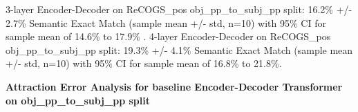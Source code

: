 \documentclass[11pt]{article}
\begin{document}
3-layer \cite{Wu2023} Encoder-Decoder on ReCOGS\_pos obj\_pp\_to\_subj\_pp split: 16.2\% +/- 2.7\% Semantic Exact Match (sample mean +/- std, n=10) with 95\% CI for sample mean of 14.6\% to 17.9\% . 4-layer \cite{Wu2023} Encoder-Decoder on ReCOGS\_pos obj\_pp\_to\_subj\_pp split: 19.3\% +/- 4.1\% Semantic Exact Match (sample mean +/- std, n=10) with 95\% CI for sample mean of 16.8\% to 21.8\%.

\textbf{Attraction Error Analysis for \cite{Wu2023} baseline Encoder-Decoder Transformer on obj\_pp\_to\_subj\_pp split}


\end{document}

